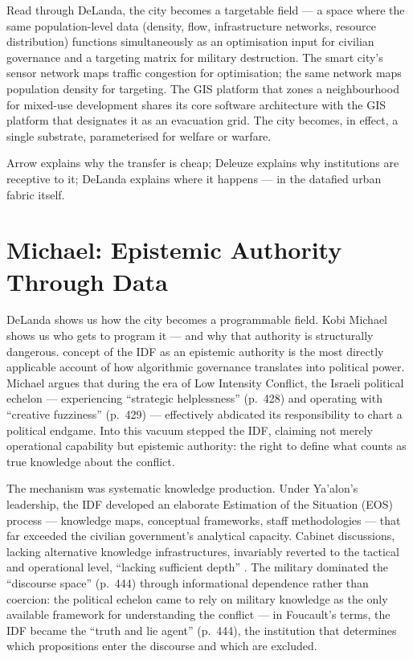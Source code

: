 \documentclass[12pt,a4paper,twoside]{report}
\begin{document}
Read through DeLanda, the city becomes a targetable field — a space where the same population-level data (density, flow, infrastructure networks, resource distribution) functions simultaneously as an optimisation input for civilian governance and a targeting matrix for military destruction. The smart city's sensor network maps traffic congestion for optimisation; the same network maps population density for targeting. The GIS platform that zones a neighbourhood for mixed-use development shares its core software architecture with the GIS platform that designates it as an evacuation grid. The city becomes, in effect, a single substrate, parameterised for welfare or warfare.

Arrow explains why the transfer is cheap; Deleuze explains why institutions are receptive to it; DeLanda explains where it happens — in the datafied urban fabric itself.

\section{Michael: Epistemic Authority Through Data}
\label{sec:michael}

DeLanda shows us how the city becomes a programmable field. Kobi Michael shows us who gets to program it — and why that authority is structurally dangerous. \textcite{michael2007} concept of the IDF as an epistemic authority is the most directly applicable account of how algorithmic governance translates into political power. Michael argues that during the era of Low Intensity Conflict, the Israeli political echelon — experiencing ``strategic helplessness'' (p.~428) and operating with ``creative fuzziness'' (p.~429) — effectively abdicated its responsibility to chart a political endgame. Into this vacuum stepped the IDF, claiming not merely operational capability but epistemic authority: the right to define what counts as true knowledge about the conflict.

The mechanism was systematic knowledge production. Under Ya'alon's leadership, the IDF developed an elaborate Estimation of the Situation (EOS) process — knowledge maps, conceptual frameworks, staff methodologies — that far exceeded the civilian government's analytical capacity. Cabinet discussions, lacking alternative knowledge infrastructures, invariably reverted to the tactical and operational level, ``lacking sufficient depth'' \parencite[p.~439]{michael2007}. The military dominated the ``discourse space'' (p.~444) through informational dependence rather than coercion: the political echelon came to rely on military knowledge as the only available framework for understanding the conflict — in Foucault's terms, the IDF became the ``truth and lie agent'' (p.~444), the institution that determines which propositions enter the discourse and which are excluded.
\end{document}
